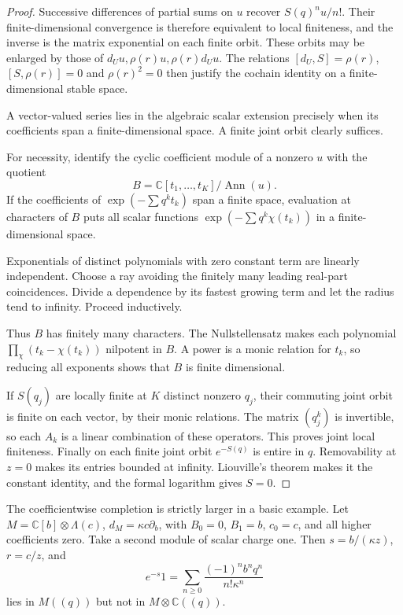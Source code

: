\begin{proof}
Successive differences of partial sums on \(u\) recover \(S(q)^nu/n!\).
Their finite-dimensional convergence is therefore equivalent to local
finiteness, and the inverse is the matrix exponential on each finite orbit.
These orbits may be enlarged by those of \(d_Uu,\rho(r)u,\rho(r)d_Uu\). The
relations \([d_U,S]=\rho(r)\), \([S,\rho(r)]=0\) and \(\rho(r)^2=0\) then
justify the cochain identity on a finite-dimensional stable space.

A vector-valued series lies in the algebraic scalar extension precisely when
its coefficients span a finite-dimensional space. A finite joint orbit
clearly suffices.

For necessity, identify the cyclic coefficient module of a nonzero \(u\)
with the quotient
\[
 B=\mathbb C[t_1,\ldots,t_K]/\operatorname{Ann}(u).
\]
If the coefficients of \(\exp(-\sum q^kt_k)\) span a finite space,
evaluation at characters of \(B\) puts all scalar functions
\(\exp(-\sum q^k\chi(t_k))\) in a finite-dimensional space.

Exponentials of distinct polynomials with zero constant term are linearly
independent. Choose a ray avoiding the finitely many leading real-part
coincidences. Divide a dependence by its fastest growing term and let the
radius tend to infinity. Proceed inductively.

Thus \(B\) has finitely many characters. The Nullstellensatz makes each
polynomial \(\prod_\chi(t_k-\chi(t_k))\) nilpotent in \(B\). A power is a
monic relation for \(t_k\), so reducing all exponents shows that \(B\) is
finite dimensional.

If \(S(q_j)\) are locally finite at \(K\) distinct nonzero \(q_j\), their
commuting joint orbit is finite on each vector, by their monic relations.
The matrix \((q_j^k)\) is invertible, so each \(A_k\) is a linear
combination of these operators. This proves joint local finiteness. Finally
on each finite joint orbit \(e^{-S(q)}\) is entire in \(q\). Removability at
\(z=0\) makes its entries bounded at infinity. Liouville's theorem makes it
the constant identity, and the formal logarithm gives \(S=0\).
\end{proof}

The coefficientwise completion is strictly larger in a basic example. Let
\(M=\mathbb C[b]\otimes\Lambda(c)\), \(d_M=\kappa c\partial_b\), with
\(B_0=0\), \(B_1=b\), \(c_0=c\), and all higher coefficients zero. Take a
second module of scalar charge one. Then \(s=b/(\kappa z)\), \(r=c/z\), and
\[
 e^{-s}1=\sum_{n\ge0}
              \frac{(-1)^nb^nq^n}{n!\kappa^n}
\]
lies in \(M((q))\) but not in \(M\otimes\mathbb C((q))\).

